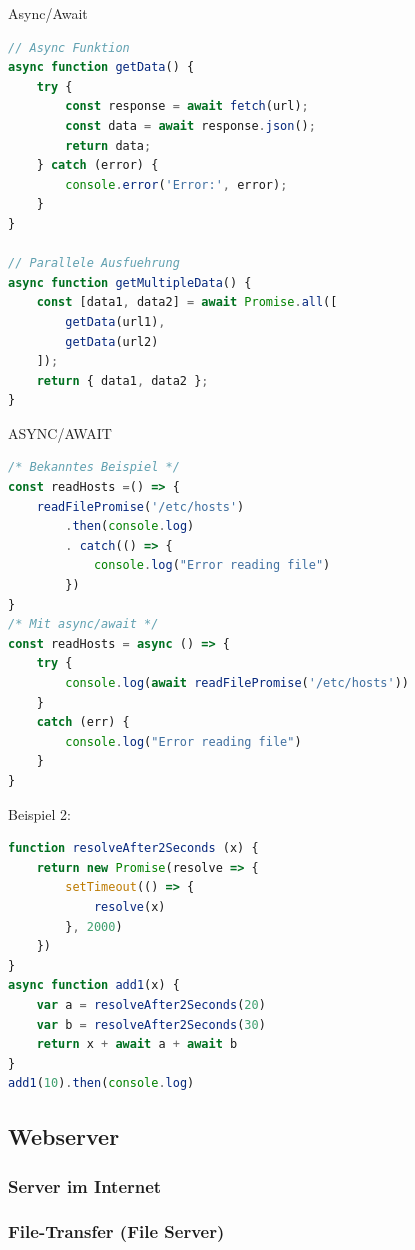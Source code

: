 \begin{KR}{Async/Await}
\begin{lstlisting}[language=JavaScript, style=basesmol]
// Async Funktion
async function getData() {
    try {
        const response = await fetch(url);
        const data = await response.json();
        return data;
    } catch (error) {
        console.error('Error:', error);
    }
}

// Parallele Ausfuehrung
async function getMultipleData() {
    const [data1, data2] = await Promise.all([
        getData(url1),
        getData(url2)
    ]);
    return { data1, data2 };
}
\end{lstlisting}
\end{KR}

\begin{code}{ASYNC/AWAIT}
\begin{lstlisting}[language=JavaScript, style=basesmol]
/* Bekanntes Beispiel */
const readHosts =() => {
    readFilePromise('/etc/hosts')
        .then(console.log)
        . catch(() => {
            console.log("Error reading file")
        })
}
/* Mit async/await */
const readHosts = async () => {
    try {
        console.log(await readFilePromise('/etc/hosts'))
    }
    catch (err) {
        console.log("Error reading file")
    }
}
\end{lstlisting}
Beispiel 2:
\begin{lstlisting}[language=JavaScript, style=basesmol]
function resolveAfter2Seconds (x) {
    return new Promise(resolve => {
        setTimeout(() => {
            resolve(x)
        }, 2000)
    })
}
async function add1(x) {
    var a = resolveAfter2Seconds(20)
    var b = resolveAfter2Seconds(30)
    return x + await a + await b
}
add1(10).then(console.log)
\end{lstlisting}
\end{code}



\pagebreak

\subsection{Webserver}

\subsubsection{Server im Internet}

\subsubsection{File-Transfer (File Server)}


